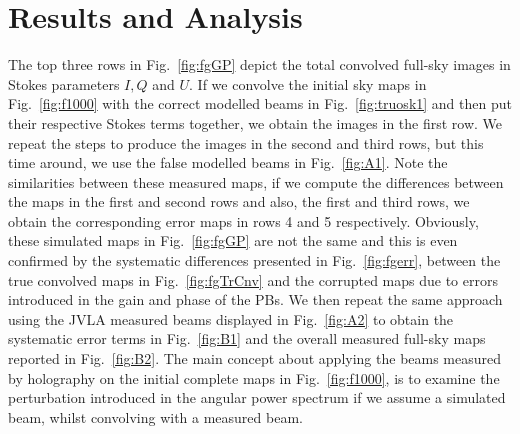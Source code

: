 \section{Results and Analysis}    \label{sec:results}
The top three rows in Fig.~\ref{fig:fgGP} depict the total convolved full-sky images in Stokes parameters $I, Q$ and $U$. If we convolve the initial sky maps in Fig.~\ref{fig:f1000}
with the correct modelled beams in Fig.~\ref{fig:truosk1} and then put their respective Stokes terms together, we obtain the images in the first row. We repeat the steps
to produce the images in the second and third rows, but this time around, we use the false modelled beams in Fig.~\ref{fig:A1}.
Note the similarities between these measured maps, if we compute the differences between the maps in the first and second rows and also, the first and third rows,
we obtain the corresponding error maps in rows 4 and 5 respectively. Obviously, these simulated maps in Fig.~\ref{fig:fgGP} are not the 
same and this is even confirmed by the systematic differences presented in Fig.~\ref{fig:fgerr}, between the true convolved maps in Fig.~\ref{fig:fgTrCnv} and the corrupted maps due to errors 
introduced in the gain and phase of the PBs.  We then repeat the same approach using the JVLA measured beams displayed in Fig.~\ref{fig:A2} 
to obtain the systematic error terms in Fig.~\ref{fig:B1} and the overall  measured full-sky maps reported in Fig.~\ref{fig:B2}.
The main concept about applying the beams measured by holography on the initial complete maps in Fig.~\ref{fig:f1000}, is to 
examine the perturbation introduced in the angular power spectrum if we assume a simulated beam, whilst convolving with a measured beam.

